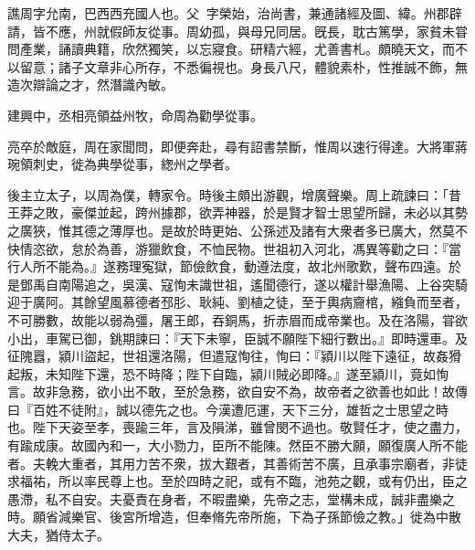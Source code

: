 \begin{pinyinscope}
 
 
 譙周字允南，巴西西充國人也。父򠐃，字榮始，治尚書，兼通諸經及圖、緯。州郡辟請，皆不應，州就假師友從事。周幼孤，與母兄同居。旣長，耽古篤學，家貧未甞問產業，誦讀典籍，欣然獨笑，以忘寢食。研精六經，尤善書札。頗曉天文，而不以留意；諸子文章非心所存，不悉徧視也。身長八尺，體貌素朴，性推誠不飾，無造次辯論之才，然潛識內敏。
 
 
 
 
 建興中，丞相亮領益州牧，命周為勸學從事。
 
 
 亮卒於敵庭，周在家聞問，即便奔赴，尋有詔書禁斷，惟周以速行得達。大將軍蔣琬領刺史，徙為典學從事，緫州之學者。
 
 
 
 
 後主立太子，以周為僕，轉家令。時後主頗出游觀，增廣聲樂。周上疏諫曰：「昔王莽之敗，豪傑並起，跨州據郡，欲弄神器，於是賢才智士思望所歸，未必以其勢之廣狹，惟其德之薄厚也。是故於時更始、公孫述及諸有大衆者多已廣大，然莫不快情恣欲，怠於為善，游獵飲食，不恤民物。世祖初入河北，馮異等勸之曰：『當行人所不能為。』遂務理寃獄，節儉飲食，動遵法度，故北州歌歎，聲布四遠。於是鄧禹自南陽追之，吳漢、寇恂未識世祖，遙聞德行，遂以權計舉漁陽、上谷突騎迎于廣阿。其餘望風慕德者邳肜、耿純、劉植之徒，至于輿病齎棺，繈負而至者，不可勝數，故能以弱為彊，屠王郎，吞銅馬，折赤眉而成帝業也。及在洛陽，甞欲小出，車駕已御，銚期諫曰：『天下未寧，臣誠不願陛下細行數出。』即時還車。及征隗囂，潁川盜起，世祖還洛陽，但遣寇恂往，恂曰：『潁川以陛下遠征，故姦猾起叛，未知陛下還，恐不時降；陛下自臨，潁川賊必即降。』遂至潁川，竟如恂言。故非急務，欲小出不敢，至於急務，欲自安不為，故帝者之欲善也如此！故傳曰『百姓不徒附』，誠以德先之也。今漢遭厄運，天下三分，雄哲之士思望之時也。陛下天姿至孝，喪踰三年，言及隕涕，雖曾閔不過也。敬賢任才，使之盡力，有踰成康。故國內和一，大小勠力，臣所不能陳。然臣不勝大願，願復廣人所不能者。夫輓大重者，其用力苦不衆，拔大艱者，其善術苦不廣，且承事宗廟者，非徒求福祐，所以率民尊上也。至於四時之祀，或有不臨，池苑之觀，或有仍出，臣之愚滯，私不自安。夫憂責在身者，不暇盡樂，先帝之志，堂構未成，誠非盡樂之時。願省減樂官、後宮所增造，但奉脩先帝所施，下為子孫節儉之教。」徙為中散大夫，猶侍太子。
 
 
 

\end{pinyinscope}
